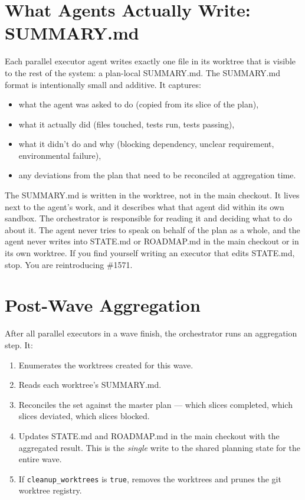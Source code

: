 \documentclass[11pt,letterpaper,openany]{book}
\begin{document}
\section{What Agents Actually Write: SUMMARY.md}

Each parallel executor agent writes exactly one file in its worktree
that is visible to the rest of the system: a plan-local SUMMARY.md.
The SUMMARY.md format is intentionally small and additive. It
captures:

\begin{itemize}
\item what the agent was asked to do (copied from its slice of the plan),
\item what it actually did (files touched, tests run, tests passing),
\item what it didn't do and why (blocking dependency, unclear requirement, environmental failure),
\item any deviations from the plan that need to be reconciled at aggregation time.
\end{itemize}

The SUMMARY.md is written in the worktree, not in the main checkout.
It lives next to the agent's work, and it describes what that agent
did within its own sandbox. The orchestrator is responsible for
reading it and deciding what to do about it. The agent never tries
to speak on behalf of the plan as a whole, and the agent never
writes into STATE.md or ROADMAP.md in the main checkout or in its
own worktree. If you find yourself writing an executor that edits
STATE.md, stop. You are reintroducing \#1571.

\section{Post-Wave Aggregation}

After all parallel executors in a wave finish, the orchestrator
runs an aggregation step. It:

\begin{enumerate}
\item Enumerates the worktrees created for this wave.
\item Reads each worktree's SUMMARY.md.
\item Reconciles the set against the master plan --- which slices
  completed, which slices deviated, which slices blocked.
\item Updates STATE.md and ROADMAP.md in the main checkout with
  the aggregated result. This is the \emph{single} write to the
  shared planning state for the entire wave.
\item If \texttt{cleanup\_worktrees} is \texttt{true}, removes the
  worktrees and prunes the git worktree registry.
\end{enumerate}
\end{document}
